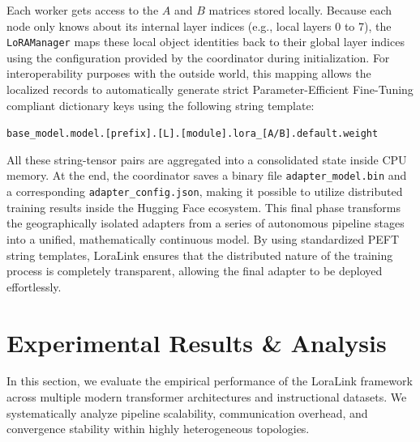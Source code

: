 \documentclass{ieeeaccess}
\begin{document}
Each worker gets access to the $A$ and $B$ matrices stored locally. Because each node only knows about its internal layer indices (e.g., local layers 0 to 7), the \texttt{LoRAManager} maps these local object identities back to their global layer indices using the configuration provided by the coordinator during initialization. For interoperability purposes with the outside world, this mapping allows the localized records to automatically generate strict Parameter-Efficient Fine-Tuning compliant dictionary keys using the following string template:

\begin{center}
\small\texttt{base\_model.model.[prefix].[L].[module].\allowbreak lora\_[A/B].default.weight}
\end{center}

All these string-tensor pairs are aggregated into a consolidated state inside CPU memory. At the end, the coordinator saves a binary file \texttt{adapter\_model.bin} and a corresponding \texttt{adapter\_config.json}, making it possible to utilize distributed training results inside the Hugging Face ecosystem. This final phase transforms the geographically isolated adapters from a series of autonomous pipeline stages into a unified, mathematically continuous model. By using standardized PEFT string templates, LoraLink ensures that the distributed nature of the training process is completely transparent, allowing the final adapter to be deployed effortlessly.

\section{Experimental Results \& Analysis}

In this section, we evaluate the empirical performance of the LoraLink framework across multiple modern transformer architectures and instructional datasets. We systematically analyze pipeline scalability, communication overhead, and convergence stability within highly heterogeneous topologies.
\end{document}
